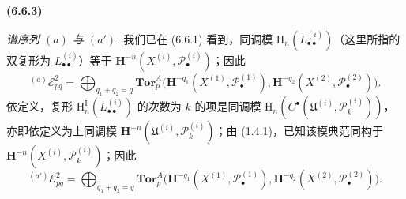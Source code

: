 \documentclass[UTF8,fontset=none,11pt,oneside,openany]{ctexbook}
\newenvironment{env}[1][]{%
  \par\medskip\noindent\textbf{(#1)}\ %
}{\par}
\begin{document}
\begin{env}[6.6.3]
\emph{谱序列 $(a)$ 与 $(a')$.} 我们已在 (6.6.1) 看到，同调模
$\mathrm H_n(L_{\bullet\bullet}^{(i)})$（这里所指的双复形为
$L_{\bullet\bullet}^{(i)}$）等于
$\mathbf H^{-n}(X^{(i)},\mathscr P_\bullet^{(i)})$；因此
\[
  {}^{(a)}\mathscr E_{pq}^2
  =\bigoplus_{q_1+q_2=q}
   \mathbf{Tor}_p^A
   \bigl(\mathbf H^{-q_1}(X^{(1)},\mathscr P_\bullet^{(1)}),
         \mathbf H^{-q_2}(X^{(2)},\mathscr P_\bullet^{(2)})\bigr).
\]
依定义，复形
$\mathrm H_n^{\mathrm I}(L_{\bullet\bullet}^{(i)})$ 的次数为 $k$ 的项是同调模
$\mathrm H_n(C^\bullet(\mathfrak U^{(i)},\mathscr P_k^{(i)}))$，亦即依定义为上同调模
$\mathbf H^{-n}(\mathfrak U^{(i)},\mathscr P_k^{(i)})$；由 (1.4.1)，已知该模典范同构于
$\mathbf H^{-n}(X^{(i)},\mathscr P_k^{(i)})$；因此
\[
  {}^{(a')}\mathscr E_{pq}^2
  =\bigoplus_{q_1+q_2=q}
   \mathbf{Tor}_p^A
   \bigl(\mathbf H^{-q_1}(X^{(1)},\mathscr P_\bullet^{(1)}),
         \mathbf H^{-q_2}(X^{(2)},\mathscr P_\bullet^{(2)})\bigr).
\]
\end{env}
\end{document}
